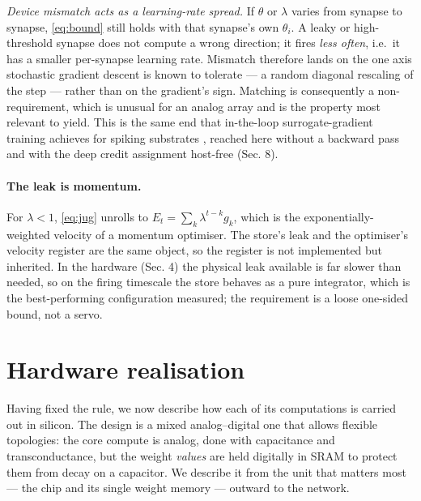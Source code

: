 \documentclass[11pt]{article}
\begin{document}
\emph{Device mismatch acts as a learning-rate spread.} If \(\theta\) or
\(\lambda\) varies from synapse to synapse, \eqref{eq:bound} still holds with that
synapse's own \(\theta_i\). A leaky or high-threshold synapse does not
compute a wrong direction; it fires \emph{less often}, i.e.~it has a
smaller per-synapse learning rate. Mismatch therefore lands on the one
axis stochastic gradient descent is known to tolerate --- a random
diagonal rescaling of the step --- rather than on the gradient's sign.
Matching is consequently a non-requirement, which is unusual for an
analog array and is the property most relevant to yield. This is the
same end that in-the-loop surrogate-gradient training achieves for
spiking substrates \cite{cramer2022surrogate}, reached here without a
backward pass and with the deep credit assignment host-free (Sec. 8).

\hypertarget{the-leak-is-momentum.}{%
\paragraph{The leak is momentum.}\label{the-leak-is-momentum.}}

For \(\lambda < 1\), \eqref{eq:jug} unrolls to \(E_t = \sum_k \lambda^{t-k} g_k\),
which is the exponentially-weighted velocity of a momentum optimiser.
The store's leak and the optimiser's velocity register are the same
object, so the register is not implemented but inherited. In the
hardware (Sec. 4) the physical leak available is far slower than needed,
so on the firing timescale the store behaves as a pure integrator, which
is the best-performing configuration measured; the requirement is a
loose one-sided bound, not a servo.

\hypertarget{sec:arch}{%
\section{Hardware realisation}\label{sec:arch}}

Having fixed the rule, we now describe how each of its computations is
carried out in silicon. The design is a mixed analog--digital one that
allows flexible topologies: the core compute is analog, done with
capacitance and transconductance, but the weight \emph{values} are held
digitally in SRAM to protect them from decay on a capacitor. We describe
it from the unit that matters most --- the chip and its single weight
memory --- outward to the network.
\end{document}
